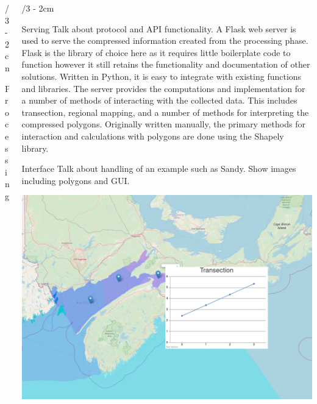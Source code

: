 \documentclass[landscape]{uioposter}
\begin{document}
\begin{frame}
\begin{columns}[onlytextwidth]
\begin{column}{\textwidth/3 - 2cm}
\begin{block}{Processing}
    \end{block}
    
\end{column}


\begin{column}{\textwidth/3 - 2cm}
    \begin{block}{Serving}
        Talk about protocol and API functionality.
        A Flask web server is used to serve the compressed information created from the processing phase.
        Flask is the library of choice here as it requires little boilerplate code to function however it still retains the functionality and documentation of other solutions.
        Written in Python, it is easy to integrate with existing functions and libraries.
        The server provides the computations and implementation for a number of methods of interacting with the collected data.
        This includes transection, regional mapping, and a number of methods for interpreting the compressed polygons.
        Originally written manually, the primary methods for interaction and calculations with polygons are done using the Shapely library.
    \end{block}

    \begin{exampleblock}{Interface}
        Talk about handling of an example such as Sandy.
        Show images including polygons and GUI.
        
        \includegraphics[scale=0.6725]{screenshot.png}
        
    \end{exampleblock}
\end{column}



\end{columns}
\end{frame}
\end{document}
